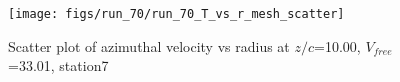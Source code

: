 \begin{figure}[H]
\centering
\texttt{[image: figs/run\_70/run\_70\_T\_vs\_r\_mesh\_scatter]}
\caption{Scatter plot of azimuthal velocity vs radius at $z/c$=10.00, $V_{free}$=33.01, station7}
\label{fig:run_70_T_vs_r_mesh_scatter}
\end{figure}


